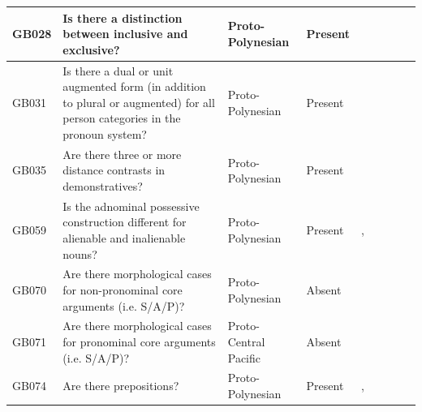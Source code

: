\documentclass[draft,10pt]{article} %
\begin{document}
\begin{landscape}
\begin{longtable}{| p{2cm}| p{3cm}| p{2.5cm}|p{2cm}|p{2cm}|p{2cm}|p{2cm}|p{2cm}|p{2cm}|}
\hline
GB028&Is there a distinction between inclusive and exclusive?&Proto-Polynesian&Present&\citet[4]{marck2000_encyclo}& \cellcolor{hedvig_lightgreen!50}{True Positive} & \cellcolor{hedvig_lightgreen!50}{True Positive} & \cellcolor{hedvig_lightgreen!50}{True Positive} & \cellcolor{hedvig_lightgreen!50}{True Positive} \\ \hline
GB031&Is there a dual or unit augmented form (in addition to plural or augmented) for all person categories in the pronoun system?&Proto-Polynesian&Present&\citet[4]{marck2000_encyclo}& \cellcolor{hedvig_lightgreen!50}{True Positive} & \cellcolor{hedvig_lightgreen!50}{True Positive} & \cellcolor{hedvig_lightgreen!50}{True Positive} & \cellcolor{hedvig_lightgreen!50}{True Positive} \\ \hline
GB035&Are there three or more distance contrasts in demonstratives?&Proto-Polynesian&Present&\citet[77]{clark1976aspects}& \cellcolor{hedvig_lightgreen!50}{True Positive} & \cellcolor{hedvig_lightgreen!50}{True Positive} & \cellcolor{hedvig_lightgreen!50}{True Positive} & \cellcolor{hedvig_lightgreen!50}{True Positive} \\ \hline
GB059&Is the adnominal possessive construction different for alienable and inalienable nouns?&Proto-Polynesian&Present&\citet[4]{marck2000_encyclo}, \citet[47]{clark1976aspects}& \cellcolor{hedvig_lightgreen!50}{True Positive} & \cellcolor{hedvig_lightgreen!50}{True Positive} & \cellcolor{hedvig_lightgreen!50}{True Positive} & \cellcolor{hedvig_lightgreen!50}{True Positive} \\ \hline
GB070&Are there morphological cases for non-pronominal core arguments (i.e. S/A/P)?&Proto-Polynesian&Absent&\cite[261-261]{chung1978}& \cellcolor{hedvig_lightgreen!50}{True Negative} & \cellcolor{hedvig_yellow!50}{True Negative} & \cellcolor{hedvig_yellow!50}{True Negative} & \cellcolor{hedvig_yellow!50}{True Negative} \\ \hline
GB071&Are there morphological cases for pronominal core arguments (i.e. S/A/P)?&Proto-Central Pacific&Absent&\citet[1]{kikusawa2002proto}& \cellcolor{hedvig_lightgreen!50}{True Negative} & \cellcolor{hedvig_yellow!50}{True Negative} & \cellcolor{hedvig_yellow!50}{True Negative} & \cellcolor{hedvig_yellow!50}{True Negative} \\ \hline
GB074&Are there prepositions?&Proto-Polynesian&Present&\citet[26]{chung1978}, \citet[24, 43]{clark1976aspects}& \cellcolor{hedvig_lightgreen!50}{True Positive} & \cellcolor{hedvig_lightgreen!50}{True Positive} & \cellcolor{hedvig_lightgreen!50}{True Positive} & \cellcolor{hedvig_lightgreen!50}{True Positive} \\ \hline

\end{longtable}
\end{landscape}
\end{document}
